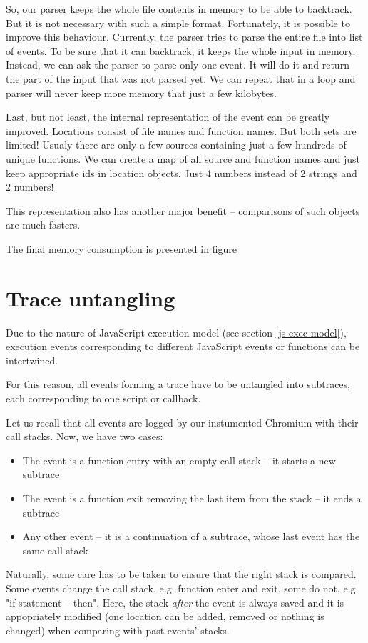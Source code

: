 So, our parser keeps the whole file contents in memory to be able to backtrack. But it is not necessary with
such a simple format. Fortunately, it is possible to improve this behaviour.
Currently, the parser tries to parse the entire file into list of events. To be sure that it can backtrack,
it keeps the whole input in memory. Instead, we can ask the parser to parse only one event. 
It will do it and return the part of the input that was not parsed yet. We can repeat that in a loop
and parser will never keep more memory that just a few kilobytes.

Last, but not least, the internal representation of the event can be greatly improved.
Locations consist of file names and function names. But both sets are limited!
Usualy there are only a few sources containing just a few hundreds of unique functions. 
We can create a map of all source and function names and just keep appropriate ids in location objects.
Just 4 numbers instead of 2 strings and 2 numbers!

This representation also has another major benefit -- comparisons of such objects are much fasters.

The final memory consumption is presented in figure


\section{Trace untangling}
Due to the nature of JavaScript execution model (see section \ref{js-exec-model}), execution events
corresponding to different JavaScript events or functions can be intertwined.

For this reason, all events forming a trace have to be untangled into subtraces, each corresponding
to one script or callback. 

Let us recall that all events are logged by our instumented Chromium with their call stacks.
Now, we have two cases:
\begin{itemize}
  \item The event is a function entry with an empty call stack -- it starts a new subtrace
  \item The event is a function exit removing the last item from the stack -- it ends a subtrace
  \item Any other event -- it is a continuation of a subtrace, whose last event has the same call stack
\end{itemize}

Naturally, some care has to be taken to ensure that the right stack is compared. Some events change the
call stack, e.g. function enter and exit, some do not, e.g. "if statement -- then".
Here, the stack \emph{after} the event is always saved and it is appopriately modified 
(one location can be added, removed or nothing is changed) when comparing
with past events' stacks.

